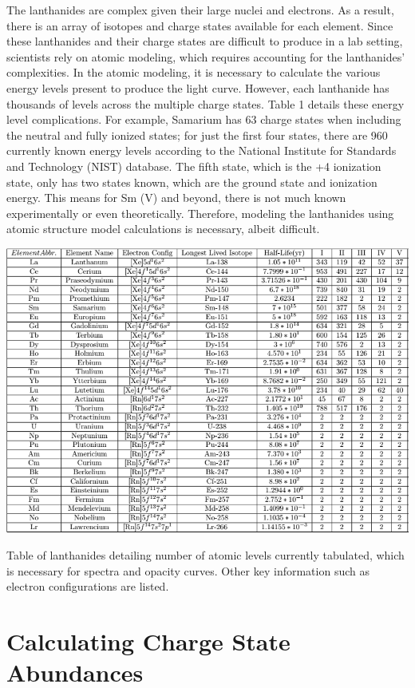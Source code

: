 \documentclass[11pt,a4paper]{article}
\begin{document}
The lanthanides are complex given their large nuclei and electrons. As a result, there is an array of isotopes and charge states available for each element. Since these lanthanides and their charge states are difficult to produce in a lab setting, scientists rely on atomic modeling, which requires accounting for the lanthanides' complexities. In the atomic modeling, it is necessary to calculate the various energy levels present to produce the light curve. However, each lanthanide has thousands of levels across the multiple charge states. Table 1 details these energy level complications. For example, Samarium has 63 charge states when including the neutral and fully ionized states; for just the first four states, there are 960 currently known energy levels according to the National Institute for Standards and Technology (NIST) database. The fifth state, which is the +4 ionization state, only has two states known, which are the ground state and ionization energy. This means for Sm (V) and beyond, there is not much known experimentally or even theoretically. Therefore, modeling the lanthanides using atomic structure model calculations is necessary, albeit difficult. 

\begin{table}[H]
  \includegraphics[width=1\textwidth]{level_pic.png}
  \caption{Table of lanthanides detailing number of atomic levels currently tabulated, which is necessary for spectra and opacity curves. Other key information such as electron configurations are listed. }
\end{table}

\section{Calculating Charge State Abundances}
\end{document}

